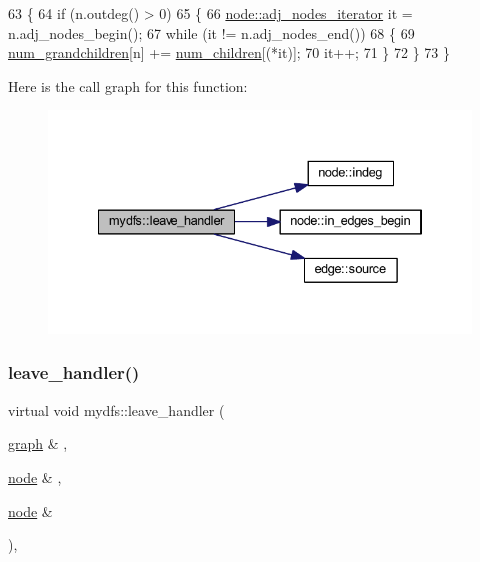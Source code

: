 \begin{DoxyCode}
63     \{
64         \textcolor{keywordflow}{if} (n.outdeg() > 0)
65         \{
66             \mbox{\hyperlink{classnode_a392f19ea6dfa344bdf5c4d5a4b25eb8c}{node::adj\_nodes\_iterator}} it = n.adj\_nodes\_begin();
67             \textcolor{keywordflow}{while} (it != n.adj\_nodes\_end())
68             \{
69                 \mbox{\hyperlink{rings_8cpp_ae20dca00c1e05052649489eb4ffe212f}{num\_grandchildren}}[n] += \mbox{\hyperlink{rings_8cpp_a021486f59a5a82e4020e5f4ce19b57a9}{num\_children}}[(*it)];
70                 it++;
71             \}
72         \}
73     \}
\end{DoxyCode}
Here is the call graph for this function\+:
\nopagebreak
\begin{figure}[H]
\begin{center}
\leavevmode
\includegraphics[width=334pt]{classmydfs_ad5c5cf421b7a3f6d6d6d3b4eba305879_cgraph}
\end{center}
\end{figure}
\mbox{\label{classmydfs_ad5c5cf421b7a3f6d6d6d3b4eba305879}} 
\subsubsection{\texorpdfstring{leave\+\_\+handler()}{leave\_handler()}\hspace{0.1cm}{\footnotesize\ttfamily [2/2]}}
{\footnotesize\ttfamily virtual void mydfs\+::leave\+\_\+handler (\begin{DoxyParamCaption}\item[{\mbox{\hyperlink{classgraph}{graph}} \&}]{,  }\item[{\mbox{\hyperlink{classnode}{node}} \&}]{,  }\item[{\mbox{\hyperlink{classnode}{node}} \&}]{ }\end{DoxyParamCaption})\hspace{0.3cm}{\ttfamily [inline]}, {\ttfamily [virtual]}}



